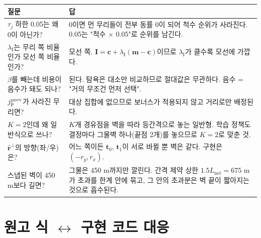 \documentclass[11pt,a4paper]{article}
\newcommand{\bfm}{\mathbf{m}}
\newcommand{\bfc}{\mathbf{c}}
\newcommand{\bfI}{\mathbf{I}}
\newcommand{\bft}{\mathbf{t}}
\newcommand{\rhat}{\hat{\mathbf{r}}}
\newcommand{\lamI}{\lambda_{\mathrm{I}}}
\newcommand{\Lnet}{L_{\mathrm{net}}}
\begin{document}
\begin{table}[H]
\centering\small
\begin{tabularx}{\textwidth}{>{\raggedright\arraybackslash}p{} >{\raggedright\arraybackslash}X}
\toprule
질문 & 답 \\
\midrule
$\tau_j$ 하한 0.05는 왜 0이 아닌가? & 0이면 먼 무리들이 전부 동률 0이 되어 척수 순위가 사라진다. 0.05는 "척수 $\times$ 0.05"로 순위를 남긴다. \\
$\lamI$는 무리 쪽 비율인가 모선 쪽 비율인가? & 모선 쪽. $\bfI = \bfc + \lamI(\bfm-\bfc)$이므로 $\lamI$가 클수록 모선에 가깝다. \\
$\beta$를 빼는데 비용이 음수가 돼도 되나? & 된다. 탐욕은 대소만 비교하므로 절대값은 무관하다. 음수 = "거의 무조건 먼저 선택". \\
$j_p^{\rm prev}$가 사라진 무리면? & 대상 집합에 없으므로 보너스가 적용되지 않고 거리로만 배정된다. \\
$K=2$인데 왜 일반식으로 쓰나? & $K$개 경유점을 벽을 따라 등간격으로 놓는 일반형. 학습 정책도 결정마다 그물벽 하나(끝점 2개)를 놓으므로 $K=2$로 맞춘 것. \\
$\rhat^\perp$의 방향(좌/우)은? & 어느 쪽이든 $\bft_0$, $\bft_1$이 서로 바뀔 뿐 벽은 같다. 구현은 $(-r_y, r_x)$. \\
스냅된 벽이 450 m보다 길면? & 그물은 450 m까지만 깔린다. 간격 제약 상한 $1.5\Lnet=675$ m가 초과를 한계 안에 묶고, 그 안의 초과분은 벽 끝이 짧아지는 것으로 흡수된다. \\
\bottomrule
\end{tabularx}
\end{table}

\appendix
\section{원고 식 $\leftrightarrow$ 구현 코드 대응}
\end{document}
